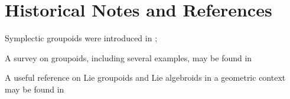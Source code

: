 \section{Historical Notes and References}
Symplectic groupoids were introduced in \cite{weinstein87}; %

A survey on groupoids, including several examples, may be found in \cite{weinstein1996} %

A useful reference on Lie groupoids and Lie algebroids in a geometric context may be found in \cite{mackenzie1987}
